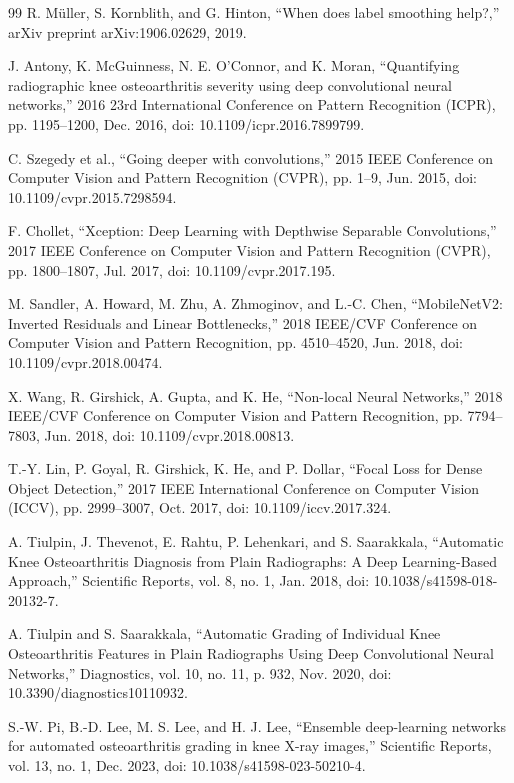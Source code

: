 \documentclass[runningheads]{llncs}
\begin{document}
\begin{thebibliography}{99}
 R. Müller, S. Kornblith, and G. Hinton, “When does label smoothing help?,” arXiv preprint arXiv:1906.02629, 2019.

 J. Antony, K. McGuinness, N. E. O’Connor, and K. Moran, “Quantifying radiographic knee osteoarthritis severity using deep convolutional neural networks,” 2016 23rd International Conference on Pattern Recognition (ICPR), pp. 1195–1200, Dec. 2016, doi: 10.1109/icpr.2016.7899799.

 C. Szegedy et al., “Going deeper with convolutions,” 2015 IEEE Conference on Computer Vision and Pattern Recognition (CVPR), pp. 1–9, Jun. 2015, doi: 10.1109/cvpr.2015.7298594.

 F. Chollet, “Xception: Deep Learning with Depthwise Separable Convolutions,” 2017 IEEE Conference on Computer Vision and Pattern Recognition (CVPR), pp. 1800–1807, Jul. 2017, doi: 10.1109/cvpr.2017.195.

 M. Sandler, A. Howard, M. Zhu, A. Zhmoginov, and L.-C. Chen, “MobileNetV2: Inverted Residuals and Linear Bottlenecks,” 2018 IEEE/CVF Conference on Computer Vision and Pattern Recognition, pp. 4510–4520, Jun. 2018, doi: 10.1109/cvpr.2018.00474.

 X. Wang, R. Girshick, A. Gupta, and K. He, “Non-local Neural Networks,” 2018 IEEE/CVF Conference on Computer Vision and Pattern Recognition, pp. 7794–7803, Jun. 2018, doi: 10.1109/cvpr.2018.00813.

 T.-Y. Lin, P. Goyal, R. Girshick, K. He, and P. Dollar, “Focal Loss for Dense Object Detection,” 2017 IEEE International Conference on Computer Vision (ICCV), pp. 2999–3007, Oct. 2017, doi: 10.1109/iccv.2017.324.

 A. Tiulpin, J. Thevenot, E. Rahtu, P. Lehenkari, and S. Saarakkala, “Automatic Knee Osteoarthritis Diagnosis from Plain Radiographs: A Deep Learning-Based Approach,” Scientific Reports, vol. 8, no. 1, Jan. 2018, doi: 10.1038/s41598-018-20132-7.

 A. Tiulpin and S. Saarakkala, “Automatic Grading of Individual Knee Osteoarthritis Features in Plain Radiographs Using Deep Convolutional Neural Networks,” Diagnostics, vol. 10, no. 11, p. 932, Nov. 2020, doi: 10.3390/diagnostics10110932.

 S.-W. Pi, B.-D. Lee, M. S. Lee, and H. J. Lee, “Ensemble deep-learning networks for automated osteoarthritis grading in knee X-ray images,” Scientific Reports, vol. 13, no. 1, Dec. 2023, doi: 10.1038/s41598-023-50210-4.


\end{thebibliography}
\end{document}
